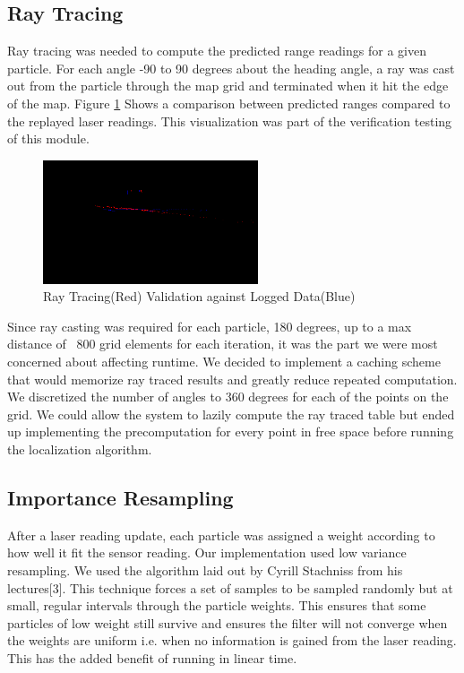 \documentclass{article}
\begin{document}
\subsection{Ray Tracing}

Ray tracing was needed to compute the predicted range readings for a given particle.  For each angle -90 to 90 degrees about the heading angle, a ray was cast out from the particle through the map grid and terminated when it hit the edge of the map.  Figure \ref{fig:5} Shows a comparison between predicted ranges compared to the replayed laser readings. This visualization was part of the verification testing of this module.

\begin{figure}[!h]
    \centering
    \includegraphics[width=2.5in]{media/ray_tracing.png}
    \caption{Ray Tracing(Red) Validation against Logged Data(Blue)}
\label{fig:5}
\end{figure}

Since ray casting was required for each particle, 180 degrees, up to a max distance of ~800 grid elements for each iteration, it was the part we were most concerned about affecting runtime.  We decided to implement a caching scheme that would memorize ray traced results and greatly reduce repeated computation. We discretized the number of angles to 360 degrees for each of the points on the grid. We could allow the system to lazily compute the ray traced table but ended up implementing the precomputation for every point in free space before running the localization algorithm.   

\subsection{Importance Resampling}

After a laser reading update, each particle was assigned a weight according to how well it fit the sensor reading. Our implementation used low variance resampling. We used the algorithm laid out by Cyrill Stachniss from his lectures[3].  This technique forces a set of samples to be sampled randomly but at small, regular intervals through the particle weights. This ensures that some particles of low weight still survive and ensures the filter will not converge when the weights are uniform i.e. when no information is gained from the laser reading.  This has the added benefit of running in linear time.
\end{document}
